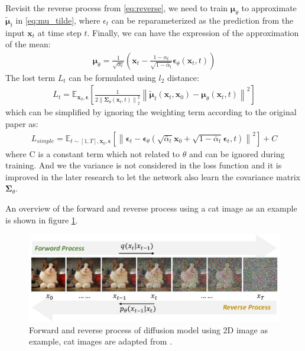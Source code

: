 \documentclass[12pt,DIV14,BCOR12mm,a4paper,footinclude=false,headinclude,parskip=half-,twoside,openright,cleardoublepage=empty,toc=index,bibliography=totoc,listof=totoc]{scrreprt}
\numberwithin{equation}{chapter}
\begin{document}
Revisit the reverse process from \ref{eq:reverse}, we need to train $\boldsymbol{\mu}_{\theta}$ to approximate $\boldsymbol{\tilde{\mu}}_{t}$ in \ref{eq:mu_tilde}, where $\epsilon_{t}$ can be reparameterized as the prediction from the input $\mathbf{x}_{t}$ at time step $t$. Finally, we can have the expression of the approximation of the mean:
\begin{align}
  \boldsymbol{\mu}_{\theta} = \frac{1}{\sqrt{\alpha_{t}}}\left(\mathbf{x}_{t} - \frac{1-\alpha_{t}}{\sqrt{1-\bar{\alpha}_{t}}}\boldsymbol{\epsilon}_{\theta}(\mathbf{x}_{t}, t)\right)
\end{align}
The lost term $L_{t}$ can be formulated using $l_{2}$ distance:
\begin{align}
  L_{t} = \mathbb{E}_{\mathbf{x}_{0},\boldsymbol{\epsilon}}\left[\frac{1}{2 \left\lVert \mathbf{\Sigma}_{\theta}(\mathbf{x}_{t},t)\right\rVert_{2}^{2}}\left\lVert\boldsymbol{\tilde{\mu}}_{t}(\mathbf{x}_{t},\mathbf{x}_{0}) - \boldsymbol{\mu}_{\theta}(\mathbf{x}_{t},t) \right\rVert ^{2}\right]
\end{align}
which can be simplified by ignoring the weighting term according to the original paper \cite{ho2020denoising} as:
\begin{align}
  L_{simple} = \mathbb{E}_{t\sim[1,T],\mathbf{x}_{0},\boldsymbol{\epsilon}}\left[\left\lVert\boldsymbol{\epsilon}_{t} - \boldsymbol{\epsilon}_{\theta}(\sqrt{\bar{\alpha}_{t}}\mathbf{x}_{0} + \sqrt{1 - \bar{\alpha}_{t}}\boldsymbol{\epsilon}_{t}, t)\right\rVert ^{2}\right] + C
\end{align}
where C is a constant term which not related to $\theta$ and can be ignored during training.  And we the variance is not considered in the loss function and it is improved in the later research \cite{nichol2021improved} to let the network also learn the covariance matrix $\mathbf{\Sigma}_{\theta}$.

An overview of the forward and reverse process using a cat image as an example is shown in figure \ref{img:diff_process}.
\begin{figure}[h]
	\centering
	\includegraphics[width=1.0\textwidth]{img/diff_process.pdf}
	\caption{Forward and reverse process of diffusion model using 2D image as example, cat images are adapted from \cite{xiao2022DDGAN}.}
	\label{img:diff_process}
\end{figure}
\end{document}
